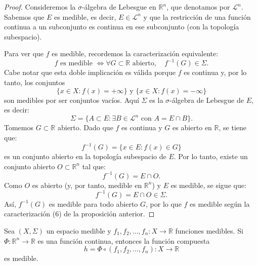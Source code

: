 \begin{proof}
    Consideremos la $\sigma$-álgebra de Lebesgue en $\mathbb{R}^n$, que denotamos por $\mathcal{L}^n$.
    Sabemos que $E$ es medible, es decir, $E \in \mathcal{L}^n$ y que la restricción de una función continua a un subconjunto es continua en ese subconjunto (con la topología subespacio).

    Para ver que $f$ es medible, recordemos la caracterización equivalente:
    \[
        f \text{ es medible } \iff \forall G \subset \mathbb{R} \text{ abierto}, \quad f^{-1}(G) \in \Sigma.
    \]
    Cabe notar que esta doble implicación es válida porque $f$ es continua y, por
    lo tanto, los conjuntos $$\{x \in X : f(x) = +\infty\} \text{ y }\{x \in X :
        f(x) = -\infty\}$$ son medibles por ser conjuntos vacíos. Aquí $\Sigma$ es la
    $\sigma$-álgebra de Lebesgue de $E$, es decir:
    \[
        \Sigma = \{ A \subset E : \exists B \in \mathcal{L}^n \text{ con } A = E \cap B \}.
    \]
    Tomemos $G \subset \mathbb{R}$ abierto. Dado que $f$ es continua y $G$ es
    abierto en $\mathbb{R}$, se tiene que:
    \[
        f^{-1}(G) = \{ x \in E : f(x) \in G \}
    \]
    es un conjunto abierto en la topología subespacio de $E$. Por lo tanto, existe
    un conjunto abierto $O \subset \mathbb{R}^n$ tal que:
    \[
        f^{-1}(G) = E \cap O.
    \]
    Como $O$ es abierto (y, por tanto, medible en $\mathbb{R}^n$) y $E$ es medible,
    se sigue que:
    \[
        f^{-1}(G) = E \cap O \in \Sigma.
    \]
    Así, $f^{-1}(G)$ es medible para todo abierto $G$, por lo que $f$ es medible
    según la caracterización (6) de la proposición anterior.
\end{proof}

\begin{proposición}
Sea $(X, \Sigma)$ un espacio medible y $f_1, f_2, \dots, f_n \colon X \to \mathbb{R}$ funciones medibles. Si $\Phi \colon \mathbb{R}^n \to \mathbb{R}$ es una función continua, entonces la función compuesta
\[
    h = \Phi \circ (f_1, f_2, \dots, f_n) \colon X \to \mathbb{R}
\]
es medible.
\end{proposición}

